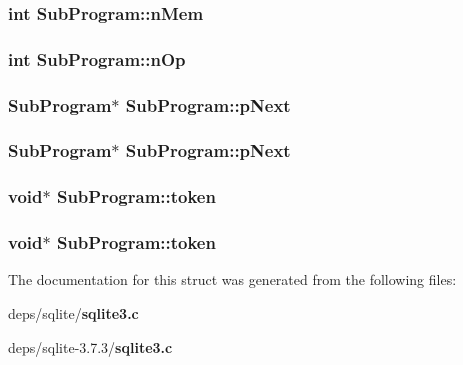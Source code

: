 \subsubsection{\setlength{\rightskip}{0pt plus 5cm}int \bf{Sub\-Program::n\-Mem}}\label{structSubProgram_2331b9ce4770969a37c9c998ed5c6252}


\subsubsection{\setlength{\rightskip}{0pt plus 5cm}int \bf{Sub\-Program::n\-Op}}\label{structSubProgram_d16f8d8dbd61a3c1ab1db6ca5b8d56c6}


\subsubsection{\setlength{\rightskip}{0pt plus 5cm}\bf{Sub\-Program}$\ast$ \bf{Sub\-Program::p\-Next}}\label{structSubProgram_53b0a9b6ca35b7a68011d55f28da54d9}


\subsubsection{\setlength{\rightskip}{0pt plus 5cm}\bf{Sub\-Program}$\ast$ \bf{Sub\-Program::p\-Next}}\label{structSubProgram_53b0a9b6ca35b7a68011d55f28da54d9}


\subsubsection{\setlength{\rightskip}{0pt plus 5cm}void$\ast$ \bf{Sub\-Program::token}}\label{structSubProgram_153636e052cd371fdb743488805adb00}


\subsubsection{\setlength{\rightskip}{0pt plus 5cm}void$\ast$ \bf{Sub\-Program::token}}\label{structSubProgram_153636e052cd371fdb743488805adb00}




The documentation for this struct was generated from the following files:\begin{CompactItemize}
\item 
deps/sqlite/\bf{sqlite3.c}\item 
deps/sqlite-3.7.3/\bf{sqlite3.c}\end{CompactItemize}

